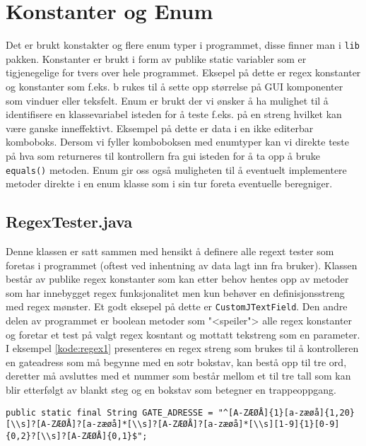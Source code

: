 \section{Konstanter og Enum}
Det er brukt konstakter og flere enum typer i programmet, disse finner man i \texttt{lib} pakken. Konstanter er brukt i form av publike static variabler som er tigjenegelige for tvers over hele programmet. Eksepel på dette er regex konstanter og konstanter som f.eks. b rukes til å sette opp størrelse på GUI komponenter som vinduer eller teksfelt. Enum er brukt der vi ønsker å ha mulighet til å identifisere en klassevariabel isteden for å teste f.eks. på en streng hvilket kan være ganske inneffektivt. Eksempel på dette er data i en ikke editerbar komboboks. Dersom vi fyller komboboksen med enumtyper kan vi direkte teste på hva som returneres til kontrollern fra gui isteden for å ta opp å bruke \texttt{equals()} metoden. Enum gir oss også muligheten til å eventuelt implementere metoder direkte i en enum klasse som i sin tur foreta eventuelle beregniger. 

\subsection{RegexTester.java} \label{subsec:regextest}
Denne klassen er satt sammen med hensikt å definere alle regext tester som foretas i programmet (oftest ved inhentning av data lagt inn fra bruker). Klassen består av publike regex konstanter som kan etter behov hentes opp av metoder som har innebygget regex funksjonalitet men kun behøver en definisjonsstreng med regex mønster. Et godt eksepel på dette er \texttt{CustomJTextField}. Den andre delen av programmet er boolean metoder som "<speiler"> alle regex konstanter og foretar et test på valgt regex kosntant og mottatt tekstreng som en parameter. 
I eksempel \ref{kode:regex1} presenteres en regex streng som brukes til å kontrolleren en gateadress som må begynne med en sotr bokstav, kan bestå opp til tre ord, deretter må avsluttes med et nummer som består mellom et til tre tall som kan blir etterfølgt av blankt steg og en bokstav som betegner en trappeoppgang.

\begin{lstlisting}[caption=Regexstreng for gateadresse og husnummer.,label=kode:regex1]
	public static final String GATE_ADRESSE = "^[A-ZÆØÅ]{1}[a-zæøå]{1,20}[\\s]?[A-ZÆØÅ]?[a-zæøå]*[\\s]?[A-ZÆØÅ]?[a-zæøå]*[\\s][1-9]{1}[0-9]{0,2}?[\\s]?[A-ZÆØÅ]{0,1}$";
\end{lstlisting}

